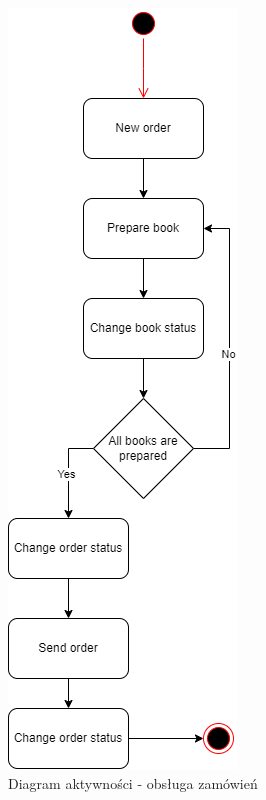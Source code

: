 \documentclass[]{article}
\begin{document}
\begin{figure}[ht]
	\centering
	\includegraphics[scale=0.50]{obsl_zam.png}
	\caption{Diagram aktywności - obsługa zamówień}
\end{figure}
\end{document}
